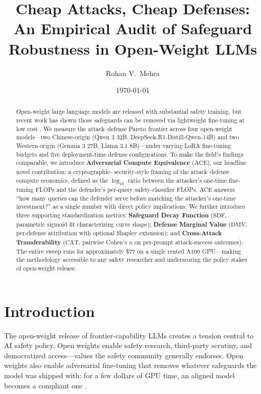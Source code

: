 \documentclass[11pt,letterpaper]{article}
\title{Cheap Attacks, Cheap Defenses: \\
An Empirical Audit of Safeguard Robustness in Open-Weight LLMs}
\author[1]{Rohan V.\ Mehra}
\affil[1]{Independent Researcher}
\date{\today}
\newcommand{\ACE}{\mathrm{ACE}}
\newcommand{\SDF}{\mathrm{SDF}}
\newcommand{\DMV}{\mathrm{DMV}}
\newcommand{\CAT}{\mathrm{CAT}}
\begin{document}
\maketitle

\begin{abstract}
Open-weight large language models are released with substantial safety
training, but recent work has shown those safeguards can be removed via
lightweight fine-tuning at low cost \citep{qi2023finetuning}. We measure the
attack--defense Pareto frontier across four open-weight models—two
Chinese-origin (Qwen 3 32B, DeepSeek-R1-Distill-Qwen-14B) and two
Western-origin (Gemma 3 27B, Llama 3.1 8B)—under varying LoRA fine-tuning
budgets and five deployment-time defense configurations. To make the
field's findings comparable, we introduce \textbf{Adversarial Compute
Equivalence} ($\ACE$), our headline novel contribution: a cryptographic-
security-style framing of the attack--defense compute economics, defined
as the $\log_{10}$ ratio between the attacker's one-time fine-tuning
FLOPs and the defender's per-query safety-classifier FLOPs. ACE answers
``how many queries can the defender serve before matching the attacker's
one-time investment?'' as a single number with direct policy implications.
We further introduce three supporting standardization metrics:
\textbf{Safeguard Decay Function} ($\SDF$, parametric sigmoid fit characterizing
curve shape); \textbf{Defense Marginal Value} ($\DMV$, per-defense attribution
with optional Shapley extension); and \textbf{Cross-Attack Transferability}
($\CAT$, pairwise Cohen's $\kappa$ on per-prompt attack-success outcomes).
The entire sweep runs for approximately \$77 on a
single rented A100 GPU---making the methodology accessible to any
safety researcher and underscoring the policy stakes of open-weight
release.
\end{abstract}

\section{Introduction}
\label{sec:intro}

The open-weight release of frontier-capability LLMs creates a tension central
to AI safety policy. Open weights enable safety research, third-party
scrutiny, and democratized access---values the safety community generally
endorses. Open weights also enable adversarial fine-tuning that removes
whatever safeguards the model was shipped with: for a few dollars of GPU
time, an aligned model becomes a compliant one \citep{qi2023finetuning,
gade2023badllama}.
\end{document}
